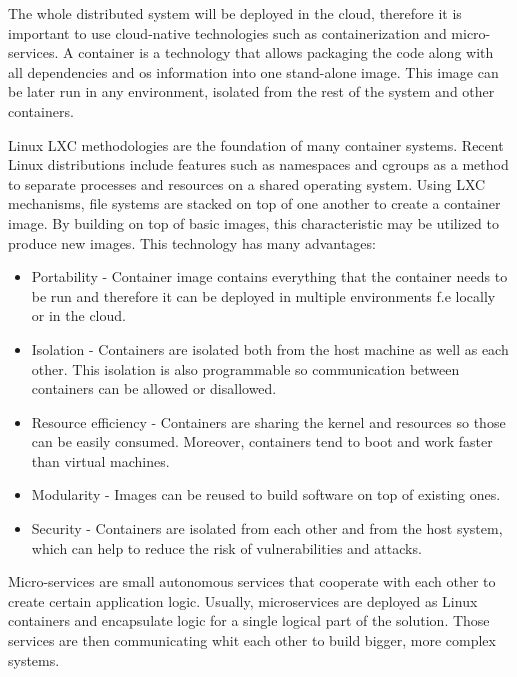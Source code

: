 The whole distributed system will be deployed in the cloud, therefore it is important to use cloud-native technologies such as containerization and micro-services. A container is a technology that allows packaging the code along with all dependencies and os information into one stand-alone image. This image can be later run in any environment, isolated from the rest of the system and other containers\cite{container_technologies}.

Linux LXC methodologies are the foundation of many container systems. Recent Linux distributions include features such as namespaces and cgroups as a method to separate processes and resources on a shared operating system. Using LXC mechanisms, file systems are stacked on top of one another to create a container image. By building on top of basic images, this characteristic may be utilized to produce new images\cite{container_technologies}. This technology has many advantages:
\begin{itemize}
    \item Portability - Container image contains everything that the container needs to be run and therefore it can be deployed in multiple environments f.e locally or in the cloud.

    \item  Isolation - Containers are isolated both from the host machine as well as each other. This isolation is also programmable so communication between containers can be allowed or disallowed.

    \item Resource efficiency - Containers are sharing the kernel and resources so those can be easily consumed. Moreover, containers tend to boot and work faster than virtual machines.
    
    \item Modularity - Images can be reused to build software on top of existing ones.
    
    \item Security - Containers are isolated from each other and from the host system, which can help to reduce the risk of vulnerabilities and attacks.
\end{itemize}

Micro-services are small autonomous services that cooperate with each other to create certain application logic\cite{building_microservices}. Usually, microservices are deployed as Linux containers and encapsulate logic for a single logical part of the solution. Those services are then communicating whit each other to build bigger, more complex systems.